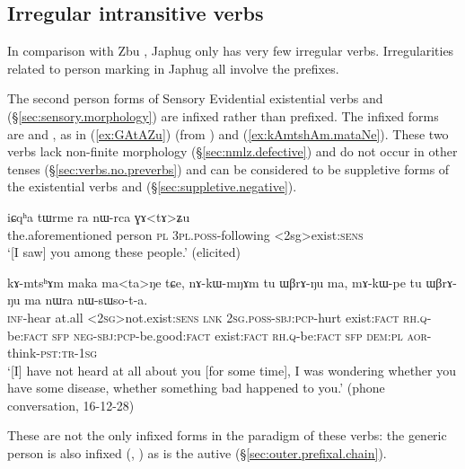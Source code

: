 \subsection{Irregular intransitive verbs} \label{sec:intr.person.irregular}
  
In comparison with Zbu \citep{gong18these}, Japhug only has very few irregular verbs. Irregularities related to person marking in Japhug all involve the prefixes.

The second person forms of Sensory Evidential existential verbs  and  (§\ref{sec:sensory.morphology}) are infixed rather than prefixed. The infixed forms are  and , as in (\ref{ex:GAtAZu}) (from \citealt[91]{jacques12agreement}) and  (\ref{ex:kAmtshAm.mataNe}). These two verbs lack non-finite morphology (§\ref{sec:nmlz.defective}) and do not occur in other tenses (§\ref{sec:verbs.no.preverbs}) and can be considered to be suppletive forms of the existential verbs  and  (§\ref{sec:suppletive.negative}).

\begin{exe}
\ex \label{ex:GAtAZu}
\gll iɕqʰa tɯrme ra nɯ-rca ɣɤ<tɤ>ʑu \\
the.aforementioned person \textsc{pl} \textsc{3pl}.\textsc{poss}-following <2sg>exist:\textsc{sens} \\
\glt `[I saw] you among these people.' (elicited)
\end{exe}

\begin{exe}
\ex \label{ex:kAmtshAm.mataNe}
\gll kɤ-mtsʰɤm maka ma<ta>ŋe tɕe, nɤ-kɯ-mŋɤm tu ɯβrɤ-ŋu ma, mɤ-kɯ-pe tu ɯβrɤ-ŋu ma nɯra nɯ-sɯso-t-a. \\
\textsc{inf}-hear at.all <\textsc{2sg}>not.exist:\textsc{sens} \textsc{lnk} \textsc{2sg}.\textsc{poss}-\textsc{sbj}:\textsc{pcp}-hurt exist:\textsc{fact} \textsc{rh}.\textsc{q}-be:\textsc{fact} \textsc{sfp}  \textsc{neg}-\textsc{sbj}:\textsc{pcp}-be.good:\textsc{fact} exist:\textsc{fact} \textsc{rh}.\textsc{q}-be:\textsc{fact} \textsc{sfp} \textsc{dem}:\textsc{pl} \textsc{aor}-think-\textsc{pst}:\textsc{tr}-\textsc{1sg} \\
\glt `[I] have not heard at all about you [for some time], I was wondering whether you have some disease, whether something bad happened to you.' (phone conversation, 16-12-28)
\end{exe}

These are not the only infixed forms in the paradigm of these verbs: the generic person  is also infixed (, ) as is the autive  (§\ref{sec:outer.prefixal.chain}).


